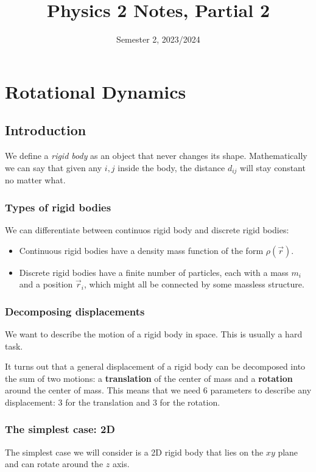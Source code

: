 \documentclass[14pt]{extarticle}
\title{Physics 2 Notes, Partial 2}
\date{Semester 2, 2023/2024}
\begin{document}
\firstpage

\section{Rotational Dynamics}

\subsection{Introduction}

We define a \emph{rigid body} as an object that never changes its shape.
Mathematically we can say that given any $i, j$ inside the body, the distance $d_{ij}$ will stay constant no matter what.

\subsubsection{Types of rigid bodies}

We can differentiate between continuos rigid body and discrete rigid bodies:
\begin{itemize}
    \item Continuous rigid bodies have a density mass function of the form $\rho(\vec{r})$.
    \item Discrete rigid bodies have a finite number of particles, each with a mass $m_i$ and a position $\vec{r}_i$, which might all be connected by some massless structure.
\end{itemize}

\subsubsection{Decomposing displacements}

We want to describe the motion of a rigid body in space. This is usually a hard task.

It turns out that a general displacement of a rigid body can be decomposed into the sum of two motions: a \textbf{translation} of the center of mass and a \textbf{rotation} around the center of mass.
This means that we need 6 parameters to describe any displacement: 3 for the translation and 3 for the rotation.

\subsubsection{The simplest case: 2D}

The simplest case we will consider is a 2D rigid body that lies on the $xy$ plane and can rotate around the $z$ axis.
\end{document}
